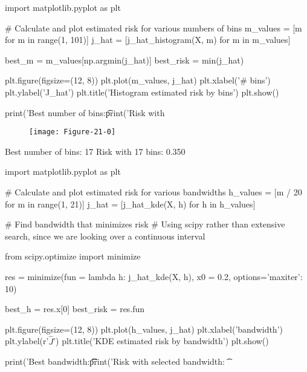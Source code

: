 \begin{python}
import matplotlib.pyplot as plt

# Calculate and plot estimated risk for various numbers of bins
m_values = [m for m in range(1, 101)]
j_hat = [j_hat_histogram(X, m) for m in m_values]

best_m = m_values[np.argmin(j_hat)]
best_risk = min(j_hat)
\end{python}

\begin{python}
plt.figure(figsize=(12, 8))
plt.plot(m_values, j_hat)
plt.xlabel('# bins')
plt.ylabel('J_hat')
plt.title('Histogram estimated risk by bins')
plt.show()

print('Best number of bins:\t%
print('Risk with %
\end{python}

\begin{figure}[H]
\centering
\texttt{[image: Figure-21-0]}
\end{figure}

\begin{console}
Best number of bins:    17
Risk with 17 bins:      0.350
\end{console}

\begin{python}
import matplotlib.pyplot as plt

# Calculate and plot estimated risk for various bandwidths
h_values = [m / 20 for m in range(1, 21)]
j_hat = [j_hat_{k}de(X, h) for h in h_values]
\end{python}

\begin{python}
# Find bandwidth that minimizes risk
# Using scipy rather than extensive search, since we are looking over a continuous interval

from scipy.optimize import minimize

res = minimize(fun = lambda h: j_hat_{k}de(X, h), x0 = 0.2, options={'maxiter': 10})

best_h = res.x[0]
best_risk = res.fun
\end{python}

\begin{python}
plt.figure(figsize=(12, 8))
plt.plot(h_values, j_hat)
plt.xlabel('bandwidth')
plt.ylabel(r'$\hat{J}$')
plt.title('KDE estimated risk by bandwidth')
plt.show()

print('Best bandwidth:\t\t\t%
print('Risk with selected bandwidth: \t%
\end{python}

